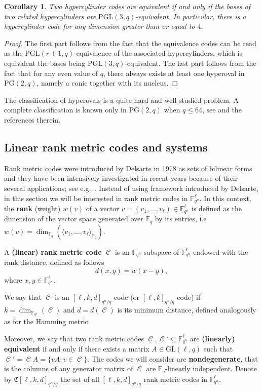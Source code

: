 \documentclass[11pt]{amsart}
\DeclareMathOperator{\C}{\mathcal{C}}
\newtheorem{corollary}[theorem]{Corollary}
\newcommand{\F}{{\mathbb F}}
\newcommand{\fq}{{\mathbb F}_{q}}
\newcommand{\PG}{\mathrm{PG}}
\begin{document}
\begin{corollary}
Two hypercylinder codes are equivalent if and only if the bases of two related hypercylinders are $\mathrm{PGL}(3,q)$-equivalent.
In particular, there is a hypercylinder code for any dimension greater than or equal to $4$.
\end{corollary}
\begin{proof}
The first part follows from the fact that the equivalence codes can be read as the $\mathrm{PGL}(r+1,q)$-equivalence of the associated hypercylinders, which is equivalent the bases being $\mathrm{PGL}(3,q)$-equivalent.
The last part follows from the fact that for any even value of $q$, there always exists at least one hyperoval in $\PG(2,q)$, namely a conic together with its nucleus.
\end{proof}

The classification of hyperovals is a quite hard and well-studied problem. A complete classification is known only in $\PG(2,q)$ when $q\leq 64$, see \cite{vandendriessche2019classification} and the references therein.

\subsection{Linear rank metric codes and systems}

Rank metric codes were introduced by Delsarte \cite{de78} in 1978 as sets of bilinear forms and they have been intensively investigated in recent years because of their several applications; see e.g.\ \cite{gorla2021rank,sheekeysurvey,polverino2020connections}.
Instead of using framework introduced by Delsarte, in this section we will be interested in rank metric codes in $\F_{q^n}^\ell$.
In this context, the \textbf{rank} (weight) $w(v)$ of a vector $v=(v_1,\ldots,v_{\ell}) \in \F_{q^n}^{\ell}$ is defined as the dimension of the vector space generated over $\F_q$ by its entries, i.e $w(v)=\dim_{\fq} (\langle v_1,\ldots, v_{\ell}\rangle_{\fq})$. 

A \textbf{(linear) rank metric code} $\C$ is an $\F_{q^n}$-subspace of $\F_{q^n}^{\ell}$ endowed with the rank distance, defined as follows
\[
d(x,y)=w(x-y),
\]
where $x, y \in \F_{q^n}^{\ell}$. 

We say that $\C$ is an $[\ell,k,d]_{q^n/q}$ code (or $[\ell,k]_{q^n/q}$ code) if $k=\dim_{\F_{q^n}}(\C)$ and $d=d(\C)$ is its minimum distance, defined analogously as for the Hamming metric. 

Moreover, we say that two rank metric codes $\C,\C' \subseteq \F_{q^n}^{\ell}$ are \textbf{(linearly) equivalent} if and only if there exists a matrix $A \in \mathrm{GL}(\ell,q)$ such that
$\C'=\C A=\{vA : v \in \C\}$. 
The codes we will consider are \textbf{nondegenerate}, that is the columns of any generator matrix of $\C$ are $\fq$-linearly independent. Denote by $ \mathfrak{C}[\ell,k,d]_{q^n/q}$ the set of all $[\ell,k,d]_{q^n/q}$ rank metric codes in $\F_{q^n}^{\ell}$.
\end{document}
